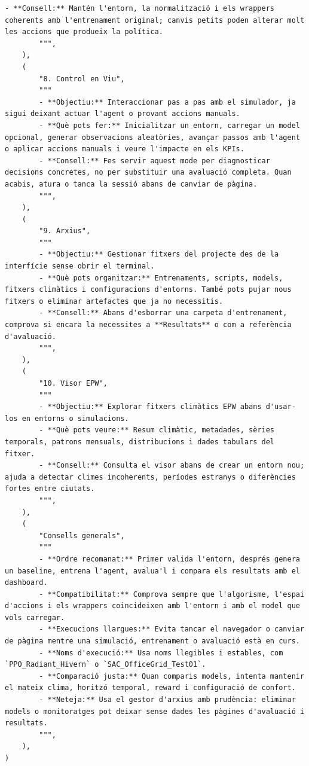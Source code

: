 \documentclass[10pt,a4paper]{article}
\begin{document}
\begin{lstlisting}[style=studioPython,caption={pages/Ajuda.py},label={lst:pages-ajuda-py}]
        - **Consell:** Mantén l'entorn, la normalització i els wrappers coherents amb l'entrenament original; canvis petits poden alterar molt les accions que produeix la política.
        """,
    ),
    (
        "8. Control en Viu",
        """
        - **Objectiu:** Interaccionar pas a pas amb el simulador, ja sigui deixant actuar l'agent o provant accions manuals.
        - **Què pots fer:** Inicialitzar un entorn, carregar un model opcional, generar observacions aleatòries, avançar passos amb l'agent o aplicar accions manuals i veure l'impacte en els KPIs.
        - **Consell:** Fes servir aquest mode per diagnosticar decisions concretes, no per substituir una avaluació completa. Quan acabis, atura o tanca la sessió abans de canviar de pàgina.
        """,
    ),
    (
        "9. Arxius",
        """
        - **Objectiu:** Gestionar fitxers del projecte des de la interfície sense obrir el terminal.
        - **Què pots organitzar:** Entrenaments, scripts, models, fitxers climàtics i configuracions d'entorns. També pots pujar nous fitxers o eliminar artefactes que ja no necessitis.
        - **Consell:** Abans d'esborrar una carpeta d'entrenament, comprova si encara la necessites a **Resultats** o com a referència d'avaluació.
        """,
    ),
    (
        "10. Visor EPW",
        """
        - **Objectiu:** Explorar fitxers climàtics EPW abans d'usar-los en entorns o simulacions.
        - **Què pots veure:** Resum climàtic, metadades, sèries temporals, patrons mensuals, distribucions i dades tabulars del fitxer.
        - **Consell:** Consulta el visor abans de crear un entorn nou; ajuda a detectar climes incoherents, períodes estranys o diferències fortes entre ciutats.
        """,
    ),
    (
        "Consells generals",
        """
        - **Ordre recomanat:** Primer valida l'entorn, després genera un baseline, entrena l'agent, avalua'l i compara els resultats amb el dashboard.
        - **Compatibilitat:** Comprova sempre que l'algorisme, l'espai d'accions i els wrappers coincideixen amb l'entorn i amb el model que vols carregar.
        - **Execucions llargues:** Evita tancar el navegador o canviar de pàgina mentre una simulació, entrenament o avaluació està en curs.
        - **Noms d'execució:** Usa noms llegibles i estables, com `PPO_Radiant_Hivern` o `SAC_OfficeGrid_Test01`.
        - **Comparació justa:** Quan comparis models, intenta mantenir el mateix clima, horitzó temporal, reward i configuració de confort.
        - **Neteja:** Usa el gestor d'arxius amb prudència: eliminar models o monitoratges pot deixar sense dades les pàgines d'avaluació i resultats.
        """,
    ),
)



\end{lstlisting}
\end{document}

